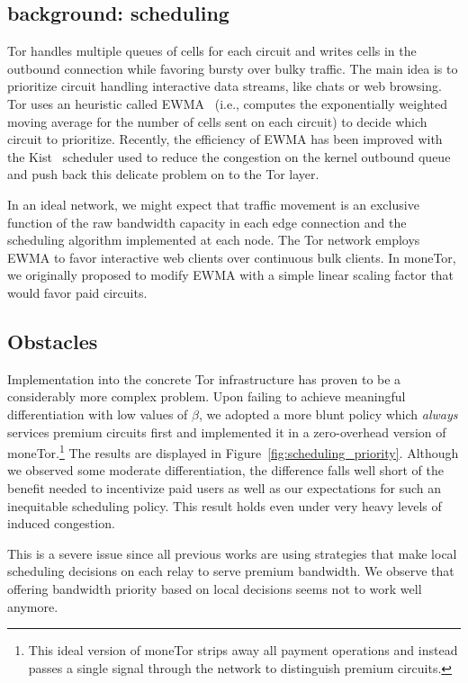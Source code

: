 \subsection{background: scheduling}

Tor handles multiple queues of cells for each circuit and writes cells in the outbound connection while favoring bursty over bulky traffic.
The main idea is to prioritize circuit handling interactive data streams, like chats or web browsing.
Tor uses an heuristic called EWMA~\cite{tang2010improved} (i.e., computes the exponentially weighted moving average for the number of cells sent on each circuit) to decide which circuit to prioritize.
Recently, the efficiency of EWMA has been improved with the Kist~\cite{jansen2014never} scheduler used to reduce the congestion on the kernel outbound queue and push back this delicate problem on to the Tor layer.

In an ideal network, we might expect that traffic movement is an exclusive function of the raw bandwidth capacity in each edge connection and the scheduling algorithm implemented at each node.
The Tor network employs EWMA to favor interactive web clients over continuous bulk clients.
In moneTor, we originally proposed to modify EWMA with a simple linear scaling factor that would favor paid circuits.

\subsection{Obstacles}

Implementation into the concrete Tor infrastructure has proven to be a considerably more complex problem.
Upon failing to achieve meaningful differentiation with low values of $\beta$, we adopted a more blunt policy which \emph{always} services premium circuits first and implemented it in a zero-overhead version of moneTor.\footnote{This ideal version of moneTor strips away all payment operations and instead passes a single signal through the network to distinguish premium circuits.}
The results are displayed in Figure~\ref{fig:scheduling_priority}.
Although we observed some moderate differentiation, the difference falls well short of the benefit needed to incentivize paid users as well as our expectations for such an inequitable scheduling policy.
This result holds even under very heavy levels of induced congestion.

This is a severe issue since all previous works are using strategies that make local scheduling decisions on each relay to serve premium bandwidth.
We observe that offering bandwidth priority based on local decisions seems not to work well anymore.

